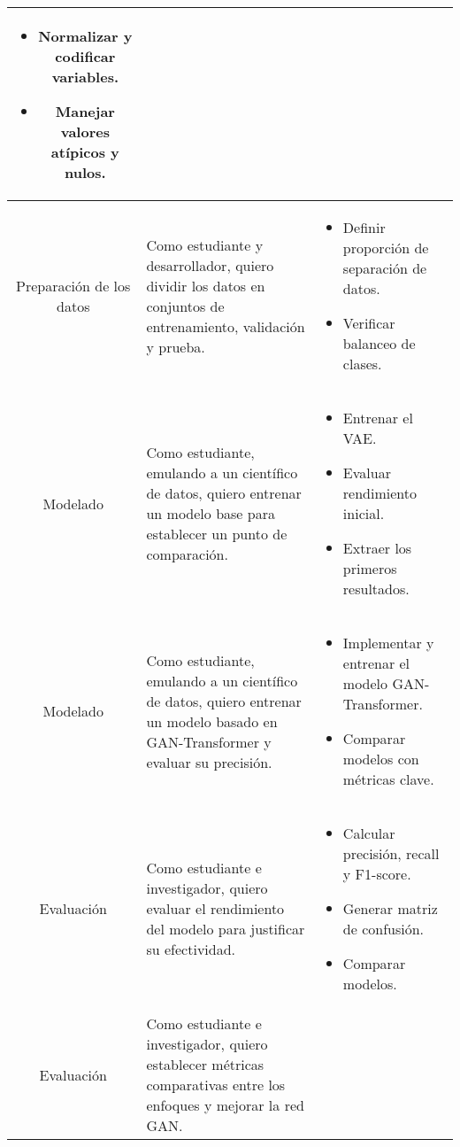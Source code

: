 \begin{table}[h]
{\begin{tabular}{|c|p{8cm}|p{8cm}|}
\begin{itemize}
            \item Normalizar y codificar variables.
            \item Manejar valores atípicos y nulos.
        \end{itemize} \\
        \hline
        Preparación de los datos & Como estudiante y desarrollador, quiero dividir los datos en conjuntos de entrenamiento, validación y prueba. & 
        \begin{itemize}
            \item Definir proporción de separación de datos.
            \item Verificar balanceo de clases.
        \end{itemize} \\
        \hline
        Modelado & Como estudiante, emulando a un científico de datos, quiero entrenar un modelo base para establecer un punto de comparación. & 
        \begin{itemize}
            \item Entrenar el VAE.
            \item Evaluar rendimiento inicial.
            \item Extraer los primeros resultados.
        \end{itemize} \\
        \hline
        Modelado & Como estudiante, emulando a un científico de datos, quiero entrenar un modelo basado en GAN-Transformer y evaluar su precisión. & 
        \begin{itemize}
            \item Implementar y entrenar el modelo GAN-Transformer.
            \item Comparar modelos con métricas clave.
        \end{itemize} \\
        \hline
        Evaluación & Como estudiante e investigador, quiero evaluar el rendimiento del modelo para justificar su efectividad. &
        \begin{itemize}
            \item Calcular precisión, recall y F1-score.
            \item Generar matriz de confusión.
            \item Comparar modelos.
        \end{itemize} \\
        \hline
        Evaluación & Como estudiante e investigador, quiero establecer métricas comparativas entre los enfoques y mejorar la red GAN. & 

\end{tabular}}
\end{table}
